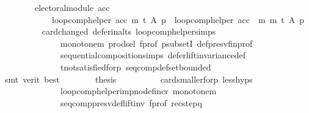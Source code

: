 \begin{isabellebody}
\ \ \ \ \ \ \ \ {\isachardoublequoteopen}electoral{\isacharunderscore}{\kern0pt}module\ acc\ {\isasymlongrightarrow}\isanewline
\ \ \ \ \ \ \ \ \ \ \ \ loop{\isacharunderscore}{\kern0pt}comp{\isacharunderscore}{\kern0pt}helper\ acc\ m\ t\ A\ p\ {\isacharequal}{\kern0pt}\ loop{\isacharunderscore}{\kern0pt}comp{\isacharunderscore}{\kern0pt}helper\ {\isacharparenleft}{\kern0pt}acc\ {\isasymtriangleright}\ m{\isacharparenright}{\kern0pt}\ m\ t\ A\ p{\isachardoublequoteclose}\isanewline
\ \ \ \ \ \ \ \ \isamarkupfalse%
\ card{\isacharunderscore}{\kern0pt}changed\ defer{\isacharunderscore}{\kern0pt}in{\isacharunderscore}{\kern0pt}alts\ loop{\isacharunderscore}{\kern0pt}comp{\isacharunderscore}{\kern0pt}helper{\isachardot}{\kern0pt}simps{\isacharparenleft}{\kern0pt}{}{\isacharparenright}{\kern0pt}\isanewline
\ \ \ \ \ \ \ \ \ \ \ \ \ \ monotone{\isacharunderscore}{\kern0pt}m\ prod{\isachardot}{\kern0pt}sel{\isacharparenleft}{\kern0pt}{}{\isacharparenright}{\kern0pt}\ f{\isacharunderscore}{\kern0pt}prof\ psubsetI\ def{\isacharunderscore}{\kern0pt}presv{\isacharunderscore}{\kern0pt}fin{\isacharunderscore}{\kern0pt}prof\isanewline
\ \ \ \ \ \ \ \ \ \ \ \ \ \ sequential{\isacharunderscore}{\kern0pt}composition{\isachardot}{\kern0pt}simps\ defer{\isacharunderscore}{\kern0pt}lift{\isacharunderscore}{\kern0pt}invariance{\isacharunderscore}{\kern0pt}def\isanewline
\ \ \ \ \ \ \ \ \ \ \ \ \ \ t{\isacharunderscore}{\kern0pt}not{\isacharunderscore}{\kern0pt}satisfied{\isacharunderscore}{\kern0pt}for{\isacharunderscore}{\kern0pt}p\ seq{\isacharunderscore}{\kern0pt}comp{\isacharunderscore}{\kern0pt}def{\isacharunderscore}{\kern0pt}set{\isacharunderscore}{\kern0pt}bounded\isanewline
\ \ \ \ \ \ \ \ \isamarkupfalse%
\ {\isacharparenleft}{\kern0pt}smt\ {\isacharparenleft}{\kern0pt}verit{\isacharcomma}{\kern0pt}\ best{\isacharparenright}{\kern0pt}{\isacharparenright}{\kern0pt}\isanewline
\ \ \ \ \ \ \isamarkupfalse%
\ {\isacharquery}{\kern0pt}thesis\isanewline
\ \ \ \ \ \ \ \ \isamarkupfalse%
\ card{\isacharunderscore}{\kern0pt}smaller{\isacharunderscore}{\kern0pt}for{\isacharunderscore}{\kern0pt}p\ less{\isachardot}{\kern0pt}hyps\isanewline
\ \ \ \ \ \ \ \ \ \ \ \ \ \ loop{\isacharunderscore}{\kern0pt}comp{\isacharunderscore}{\kern0pt}helper{\isacharunderscore}{\kern0pt}imp{\isacharunderscore}{\kern0pt}no{\isacharunderscore}{\kern0pt}def{\isacharunderscore}{\kern0pt}incr\ monotone{\isacharunderscore}{\kern0pt}m\isanewline
\ \ \ \ \ \ \ \ \ \ \ \ \ \ seq{\isacharunderscore}{\kern0pt}comp{\isacharunderscore}{\kern0pt}presv{\isacharunderscore}{\kern0pt}def{\isacharunderscore}{\kern0pt}lift{\isacharunderscore}{\kern0pt}inv\ f{\isacharunderscore}{\kern0pt}prof\ rec{\isacharunderscore}{\kern0pt}step{\isacharunderscore}{\kern0pt}q\isanewline

\end{isabellebody}
